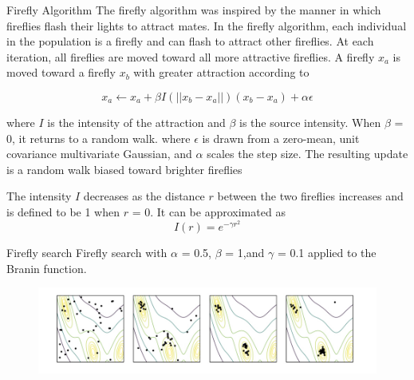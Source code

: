 \documentclass{beamer}
\begin{document}
\begin{frame}{Firefly Algorithm}
The firefly algorithm was inspired by the manner in which fireflies flash their lights to attract mates. In the firefly algorithm, each individual in the population is a firefly and can flash to attract other fireflies. At each iteration, all fireflies are moved toward all more attractive fireflies. A firefly $x_a$ is moved toward a firefly $x_b$ with greater attraction according to

\begin{equation*}
x_a \leftarrow x_a + \beta I (||x_b - x_a||)(x_b - x_a) + \alpha \epsilon
\end{equation*}

where $I$ is the intensity of the attraction and $\beta$ is the source intensity. 
When $\beta$ = 0, it returns to a random walk. where $\epsilon$ is drawn from a zero-mean, unit covariance multivariate Gaussian, and $\alpha$ scales the step size. The resulting update is a random walk biased toward brighter fireflies

The intensity $I$ decreases as the distance $r$ between the two fireflies increases and is defined to be 1 when $r$ = 0. It can be approximated as
\begin{equation*}
    I(r) = e^{-\gamma r^2}
\end{equation*}

\end{frame}

\begin{frame}{Firefly search}
Firefly search with $\alpha$ = 0.5, $\beta$ = 1,and $\gamma$ = 0.1 applied to the Branin function.
\begin{figure}
\includegraphics[width=120mm]{Figs/firefly.jpeg}
\end{figure}   

\end{frame}
\end{document}
